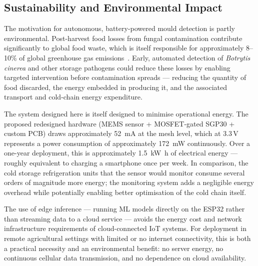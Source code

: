 \subsection{Sustainability and Environmental Impact}\label{subsec:res_sustainability}

The motivation for autonomous, battery-powered mould detection is partly environmental. Post-harvest food losses from fungal contamination contribute significantly to global food waste, which is itself responsible for approximately 8--10\% of global greenhouse gas emissions~\cite{FAOSTAT2024}. Early, automated detection of \textit{Botrytis cinerea} and other storage pathogens could reduce these losses by enabling targeted intervention before contamination spreads --- reducing the quantity of food discarded, the energy embedded in producing it, and the associated transport and cold-chain energy expenditure.

The system designed here is itself designed to minimise operational energy. The proposed redesigned hardware (MEMS sensor + MOSFET-gated SGP30 + custom PCB) draws approximately \SI{52}{\milli\ampere} at the mesh level, which at 3.3\,V represents a power consumption of approximately \SI{172}{\milli\watt} continuously. Over a one-year deployment, this is approximately \SI{1.5}{\kilo\watt\hour} of electrical energy --- roughly equivalent to charging a smartphone once per week. In comparison, the cold storage refrigeration units that the sensor would monitor consume several orders of magnitude more energy; the monitoring system adds a negligible energy overhead while potentially enabling better optimisation of the cold chain itself.

The use of edge inference --- running ML models directly on the ESP32 rather than streaming data to a cloud service --- avoids the energy cost and network infrastructure requirements of cloud-connected IoT systems. For deployment in remote agricultural settings with limited or no internet connectivity, this is both a practical necessity and an environmental benefit: no server energy, no continuous cellular data transmission, and no dependence on cloud availability.
